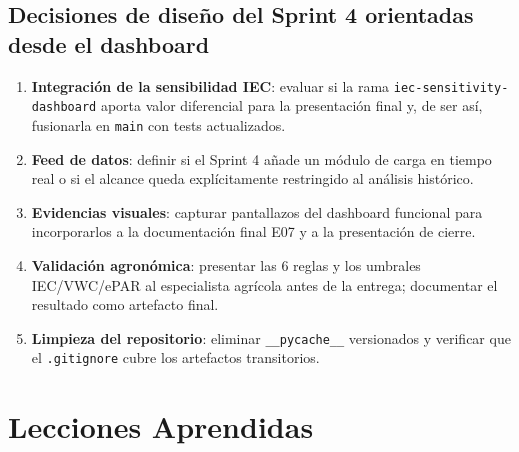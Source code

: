 \documentclass[11pt,a4paper]{article}
\begin{document}
\subsection{Decisiones de diseño del Sprint 4 orientadas desde el dashboard}

\begin{enumerate}
  \item \textbf{Integración de la sensibilidad IEC}: evaluar si la rama \texttt{iec-sensitivity-dashboard}
    aporta valor diferencial para la presentación final y, de ser así, fusionarla en
    \texttt{main} con tests actualizados.
  \item \textbf{Feed de datos}: definir si el Sprint 4 añade un módulo de carga en tiempo real o si
    el alcance queda explícitamente restringido al análisis histórico.
  \item \textbf{Evidencias visuales}: capturar pantallazos del dashboard funcional para incorporarlos
    a la documentación final E07 y a la presentación de cierre.
  \item \textbf{Validación agronómica}: presentar las 6 reglas y los umbrales IEC/VWC/ePAR al
    especialista agrícola antes de la entrega; documentar el resultado como artefacto final.
  \item \textbf{Limpieza del repositorio}: eliminar \texttt{\_\_pycache\_\_} versionados y verificar
    que el \texttt{.gitignore} cubre los artefactos transitorios.
\end{enumerate}

\section{Lecciones Aprendidas}
\end{document}
